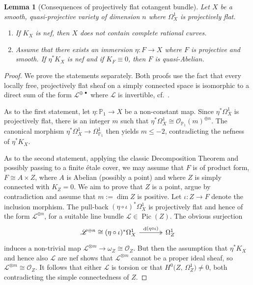 \documentclass[JEP,XML,SOM,Unicode,published]{cedram}
\let\scr\mathscr
\let\ts\relax
\newcommand{\sbullet}{{\scriptscriptstyle\bullet}}
\newenvironment{enumeraten}
{\begin{enumerate}\setcounter{enumi}{\value{equation}}\itemindent0pt}
{\setcounter{equation}{\value{enumi}}\end{enumerate}}
\theoremstyle{plain}
\newtheorem{lem}[thm]{Lemma}
\theoremstyle{definition}
\numberwithin{equation}{thm}
\numberwithin{enumi}{thm}
\DeclareMathOperator{\Pic}{Pic}
\DeclareMathOperator{\diff}{d}
\newcommand{\sL}{\scr{L}}
\newcommand{\sO}{\scr{O}}
\newcommand{\bP}{\mathbb{P}}
\begin{document}
\begin{lem}[Consequences of projectively flat cotangent bundle]\label{lem:6-5}
Let $X$ be a smooth, quasi-projective variety of dimension $n$ where $\Omega^1_X$ is
projectively flat.
\begin{enumeraten}
\item\label{il:6-5-1} If $K_X$ is nef, then $X$ does not contain complete
rational curves.

\item\label{il:6-5-2} Assume that there exists an immersion $\eta : F \to X$ where
$F$ is projective and smooth. If $\eta^* K_X$ is nef and if $K_F \equiv 0$,
then $F$ is quasi-Abelian.
\end{enumeraten}
\end{lem}
\begin{proof}
We prove the statements separately. Both proofs use the fact that every
locally free, projectively flat sheaf on a simply connected space is
isomorphic to a direct sum of the form $\sL^{\oplus\,\sbullet}$ where $\sL$ is invertible,
cf.~\cite[Prop.\,3.11]{GKP20a}.

As to the first statement, let $\eta: \bP_1 \to X$ be a non-constant map. Since
$\eta^*\Omega^1_X$ is projectively flat, there is an integer $m$ such that
$\eta^*\Omega^1_X \cong \sO_{\bP_1}(m)^{\oplus n}$. The canonical morphism $\eta^*\Omega^1_X \to \Omega^1_{\bP_1}$
then yields $m \leq -2$, contradicting the nefness of $\eta^*K_X$.

As to the second statement, applying the classic Decomposition Theorem
\cite[Th.\,1]{Bea83} and possibly passing to a finite étale cover, we may
assume that $F$ is of product form, $F \cong A \times Z$, where $A$ is Abelian
(possibly a point) and where $Z$ is simply connected with $K_Z = 0$. We aim
to prove that $Z$ is a point, argue by contradiction and assume that
$m := \dim Z$ is positive. Let $\iota: Z \to F$ denote the inclusion morphism. The
pull-back $(\eta\circ \iota)^* \Omega^1_X$ is projectively flat and hence of the form $\sL^{\oplus n}$,
for a suitable line bundle $\sL \in \Pic(Z)$. The obvious surjection
\[
\begin{tikzcd}[column sep=1.2cm]
\sL^{\oplus n} \cong (\eta\circ \iota)^* \Omega^1_X \ar[r, two heads, "\ts\diff (\eta\circ \iota)"] & \Omega^1_Z
\end{tikzcd}
\]
induces a non-trivial map $\sL^{\otimes m} \to \omega_Z \cong \sO_Z$. But then the assumption that
$\eta^*K_X$ and hence also $\sL$ are nef shows that $\sL^{\otimes m}$ cannot be a proper
ideal sheaf, so $\sL^{\otimes m} \cong \sO_Z$. It follows that either $\sL$ is torsion or that
$H^0\bigl(Z,\, \Omega^1_Z\bigr) \ne 0$, both contradicting the simple connectedness
of $Z$.
\end{proof}
\end{document}
